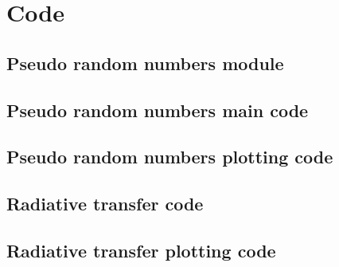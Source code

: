 \documentclass[twocolumn]{myarticle}
\begin{document}
\onecolumn

\section{Code}
\label{sec:code}

\subsection{Pseudo random numbers module}
\label{subsec:pseudo_random_numbers_module}


\vspace{10pt}

\subsection{Pseudo random numbers main code}
\label{subsec:pseudo_random_numbers_main_code}


\vspace{10pt}

\subsection{Pseudo random numbers plotting code}
\label{subsec:pseudo_random_numbers_plotting_code}


\vspace{10pt}

\subsection{Radiative transfer code}
\label{subsec:radiative_transfer_code}


\vspace{10pt}

\subsection{Radiative transfer plotting code}
\label{subsec:radiative_transfer_plotting_code}


\vspace{10pt}
\end{document}
